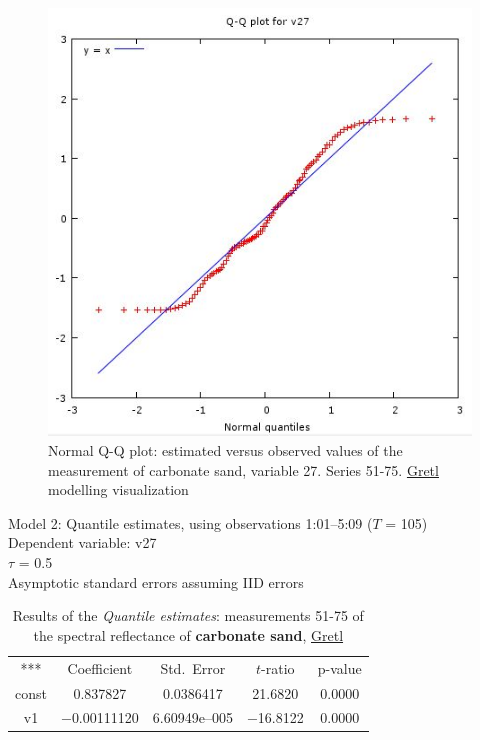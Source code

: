 \documentclass[10pt, a4paper]{article}
\begin{document}
\begin{appendices}
\begin{figure}[H]
	\begin{center}
		\includegraphics[scale=0.4]{G-QQplot-sand.jpg}
		\caption{Normal Q-Q plot: estimated versus observed values of the measurement of carbonate sand, variable 27. Series 51-75. \href{http://gretl.sourceforge.net/}{Gretl} modelling visualization­}
	\label{fig:A.30}
	\end{center}
\end{figure}

\begin{table}[H]
	\caption{Results of the \textit{Quantile estimates}: measurements 51-75 of the spectral reflectance of \textbf{carbonate sand}, \href{http://gretl.sourceforge.net/}{Gretl}}
	\begin{center}
		Model 2: Quantile estimates, using observations 1:01--5:09 ($T$ = 105)\\
		Dependent variable: v27\\
		$\tau$ = 0.5\\
		Asymptotic standard errors assuming IID errors\\

\vspace{1em}

\begin{tabular}{c c c c c}
	***   & {Coefficient} & {Std.\ Error} & {$t$-ratio} & {p-value} \\[1ex]
	const &  0.837827 &    0.0386417 &      21.6820 &         0.0000 \\
	v1 &   $-$0.00111120 &     6.60949\textrm{e--005} &       $-$16.8122 &         0.0000 \\ \hline \hline
\end{tabular}


\end{center}
\end{table}
\end{appendices}
\end{document}
